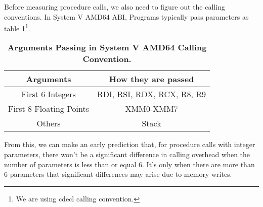 Before measuring procedure calls, we also need to figure out the calling conventions. In System V AMD64 ABI, Programs typically pass parameters as table \ref{table:calling-convention-reg}\footnote{We are using cdecl calling convention.}.
\begin{table}[h]
	\centering
	\begin{tabular}{c|c}
		\hline
		\bf{Arguments} & \bf{How they are passed} \\ \hline
		
		First 6 Integers & RDI, RSI, RDX, RCX, R8, R9 \\ \hline

		First 8 Floating Points & XMM0-XMM7 \\ \hline
		
		Others & Stack \\ \hline
	\end{tabular}
	\caption{\textbf{Arguments Passing in System V AMD64 Calling Convention.}}
	\label{table:calling-convention-reg}
\end{table}
From this, we can make an early prediction that, for procedure calls with integer parameters, there won't be a significant difference in calling overhead when the number of parameters is less than or equal 6. It's only when there are more than 6 parameters that significant differences may arise due to memory writes.

